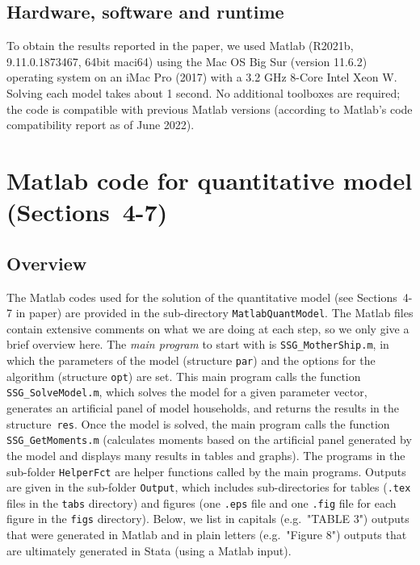 \documentclass[a4,12p]{article}
\begin{document}
\subsection{Hardware, software and runtime}
\label{sec:illust-hardw-softw-used}

To obtain the results reported in the paper, we used Matlab (R2021b,
9.11.0.1873467, 64bit maci64) using the Mac OS Big Sur (version
11.6.2) operating system on an iMac Pro (2017) with a 3.2 GHz
8-Core Intel Xeon W. Solving each model takes about 1 second. No additional toolboxes are required; the code is compatible with previous Matlab versions (according to Matlab's code compatibility report as of June 2022).


\section{Matlab code for quantitative model (Sections~4-7)} 

\subsection{Overview}
\label{sec:overview-over-code}

The Matlab codes used for the solution of the quantitative model (see Sections~4-7 in paper) are provided in the sub-directory {\tt MatlabQuantModel}. The Matlab files contain extensive comments on what we are doing at
each step, so we only give a brief overview here. The \emph{main
  program} to start with is \texttt{SSG\_MotherShip.m}, in which
the parameters of the model (structure \texttt{par}) and the options
for the algorithm (structure \texttt{opt}) are set. This main program
calls the function \texttt{SSG\_SolveModel.m}, which solves the model
for a given parameter vector, generates an artificial panel of model households, and returns the results in the
structure~\texttt{res}. Once the model is solved, the main
program calls the function \texttt{SSG\_GetMoments.m} (calculates moments
based on the artificial panel generated by the model and displays many results in tables and graphs). The programs in the
sub-folder \texttt{HelperFct} are helper functions called by the
main programs. Outputs are given in the sub-folder {\tt Output}, which includes sub-directories for tables ({\tt .tex} files in the {\tt tabs} directory) and figures (one {\tt .eps} file and one {\tt .fig} file for each figure in the {\tt figs} directory). Below, we list in capitals (e.g.\ "TABLE 3") outputs that were generated in Matlab and in plain letters (e.g.\ "Figure 8") outputs that are ultimately generated in Stata (using a Matlab input). 
\end{document}
